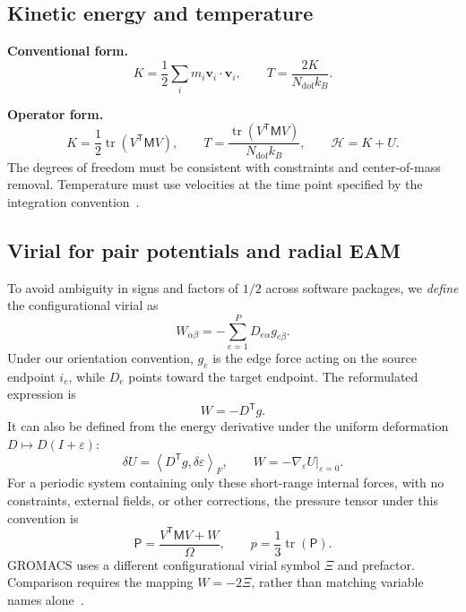\documentclass[11pt,a4paper]{article}
\newcommand{\oldform}{\par\noindent\textbf{Conventional form.}\quad}
\newcommand{\newform}{\par\noindent\textbf{Operator form.}\quad}
\newcommand{\tr}{\operatorname{tr}}
\newcommand{\ip}[2]{\left\langle #1,#2\right\rangle}
\newcommand{\vect}[1]{\bm{#1}}
\newcommand{\mass}{\mathsf M}
\theoremstyle{definition}
\begin{document}
\subsection{Kinetic energy and temperature}
\oldform
\begin{equation}
K=\frac12\sum_i m_i\vect v_i\cdot\vect v_i,\qquad
T=\frac{2K}{N_{\mathrm{dof}}k_B}.
\end{equation}
\newform
\begin{equation}
K=\frac12\tr(V^{\mathsf T}\mass V),\qquad
T=\frac{\tr(V^{\mathsf T}\mass V)}{N_{\mathrm{dof}}k_B},\qquad
\mathcal H=K+U.
\end{equation}
The degrees of freedom must be consistent with constraints and center-of-mass removal.
Temperature must use velocities at the time point specified by the integration
convention~\cite{gromacs-md}.

\subsection{Virial for pair potentials and radial EAM}
To avoid ambiguity in signs and factors of $1/2$ across software packages, we \emph{define} the
configurational virial as
\begin{equation}
W_{\alpha\beta}=-\sum_{e=1}^P D_{e\alpha}g_{e\beta}.
\label{eq:virial-component}
\end{equation}
Under our orientation convention, $g_e$ is the edge force acting on the source endpoint $i_e$,
while $D_e$ points toward the target endpoint. The reformulated expression is
\begin{equation}
W=-D^{\mathsf T}g.
\label{eq:virial-tensor}
\end{equation}
It can also be defined from the energy derivative under the uniform deformation $D\mapsto
D(I+\varepsilon)$:
\begin{equation}
\delta U=\ip{D^{\mathsf T}g}{\delta\varepsilon}_F,
\qquad W=-\left.\nabla_\varepsilon U\right|_{\varepsilon=0}.
\end{equation}
For a periodic system containing only these short-range internal forces, with no constraints,
external fields, or other corrections, the pressure tensor under this convention is
\begin{equation}
\mathsf P=\frac{V^{\mathsf T}\mass V+W}{\Omega},\qquad
p=\frac13\tr(\mathsf P).
\end{equation}
GROMACS uses a different configurational virial symbol $\Xi$ and prefactor. Comparison requires
the mapping $W=-2\Xi$, rather than matching variable names alone~\cite{gromacs-md}.
\end{document}
